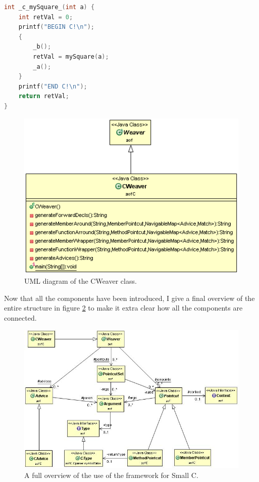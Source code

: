 \documentclass[a4paper]{report}
\begin{document}
\begin{lstlisting}[language=C, caption=A generated method for an around advice with advice nested within, label=lst:SmallC_ComplexAround]
int _c_mySquare_(int a) {
	int retVal = 0;
	printf("BEGIN C!\n");
	{
		_b();
		retVal = mySquare(a);
		_a();
	}
	printf("END C!\n");
	return retVal;
}
\end{lstlisting}
\begin{figure}
\centering
\includegraphics[scale=0.7]{images/AOFC/CWeaver.png}
\caption{UML diagram of the CWeaver class.}
\label{fig:CWeaver}
\end{figure}
Now that all the components have been introduced, I give a final overview of the entire structure in figure \ref{fig:CFull} to make it extra clear how all the components are connected.
\begin{figure}[h!]
\centering
\includegraphics[scale=0.55]{images/AOFC/CFull.jpg}
\caption{A full overview of the use of the framework for Small C.}
\label{fig:CFull}
\end{figure}
\end{document}
